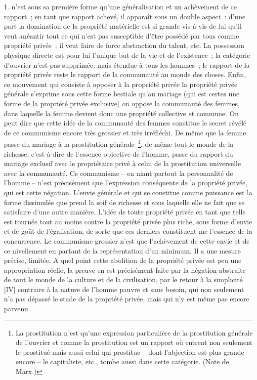 \documentclass[french,twoside]{book} %
\begin{document}
1. n’est sous sa première forme qu’une généralisation et un achèvement de ce rapport ; en tant que rapport achevé, il apparaît sous un double aspect : d’une part la domination de la propriété matérielle est si grande vis-à-vis de lui qu’il veut anéantir tout ce qui n’est pas susceptible d’être possédé par tous comme propriété privée ; il veut faire de force abstraction du talent, etc. La possession physique directe est pour lui l’unique but de la vie et de l’existence ; la catégorie d’ouvrier n’est pas supprimée, mais étendue à tous les hommes ; le rapport de la propriété privée reste le rapport de la communauté au monde des choses. Enfin, ce mouvement qui consiste à opposer à la propriété privée la propriété privée générale s’exprime sous cette forme bestiale qu’au mariage (qui est certes une forme de la propriété privée exclusive) on oppose la communauté des femmes, dans laquelle la femme devient donc une propriété collective et commune. On peut dire que cette idée de la communauté des femmes constitue le secret révélé de ce communisme encore très grossier et très irréfléchi. De même que la femme passe du mariage à la prostitution générale \footnote{La prostitution n’est qu’une expression particulière de la prostitution générale de l’ouvrier et comme la prostitution est un rapport où entrent non seulement le prostitué mais aussi celui qui prostitue – dont l’abjection est plus grande encore – le capitaliste, etc., tombe aussi dans cette catégorie. (Note de Marx.)}, de même tout le monde de la richesse, c’est-à-dire de l’essence objective de l’homme, passe du rapport du mariage exclusif avec le propriétaire privé à celui de la prostitution universelle avec la communauté. Ce communisme – en niant partout la personnalité de l’homme – n’est précisément que l’expression conséquente de la propriété privée, qui est cette négation. L’envie générale et qui se constitue comme puissance est la forme dissimulée que prend la soif de richesse et sous laquelle elle ne fait que se satisfaire d’une autre manière. L’idée de toute propriété privée en tant que telle est tournée tout au moins contre la propriété privée plus riche, sous forme d’envie et de goût de l’égalisation, de sorte que ces derniers constituent me l’essence de la concurrence. Le communisme grossier n’est que l’achèvement de cette envie et de ce nivellement en partant de la représentation d’un minimum. Il a une mesure précise, limitée. A quel point cette abolition de la propriété privée est peu une appropriation réelle, la preuve en est précisément faite par la négation abstraite de tout le monde de la culture et de la civilisation, par le retour à la simplicité [IV] contraire à la nature de l’homme pauvre et sans besoin, qui non seulement n’a pas dépassé le stade de la propriété privée, mais qui n’y est même pas encore parvenu.\par
\end{document}
